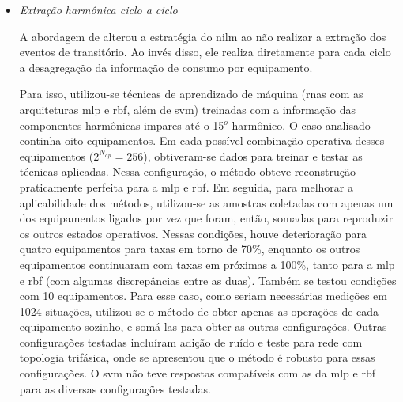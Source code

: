 \begin{enumerate}[label=\textbf{2.\arabic*},wide=\parindent]
\begin{itemize}[wide=\parindent]
\item \emph{Extração harmônica ciclo a ciclo}
\label{nilm:harmonico_ciclo_ciclo}

A abordagem de \citet{nilm_srinivasan_nn_2006_27} alterou a estratégia
do \gls{nilm} ao não realizar a extração dos eventos de transitório.
Ao invés disso, ele realiza diretamente para cada ciclo a desagregação
da informação de consumo por equipamento. 

Para isso, utilizou-se técnicas de aprendizado
de máquina (\glspl{rna} com as arquiteturas \acs{mlp} e
\acs{rbf}, além de \acs{svm}) treinadas com a informação das
componentes harmônicas impares até o 15$^o$ harmônico. O caso
analisado continha oito equipamentos. Em cada possível combinação
operativa desses equipamentos ($2^{N_{ap}}=256$), obtiveram-se dados para
treinar e testar as técnicas aplicadas. Nessa configuração, o método
obteve reconstrução praticamente perfeita para a \gls{mlp} e
\gls{rbf}. Em seguida, para melhorar a aplicabilidade dos métodos,
utilizou-se as amostras coletadas com apenas um dos equipamentos ligados
por vez que foram, então, somadas para reproduzir os outros estados
operativos. Nessas condições, houve deterioração para quatro
equipamentos para taxas em torno de 70\%, enquanto os outros equipamentos
continuaram com taxas em próximas a 100\%, tanto para a \gls{mlp} e
\gls{rbf} (com algumas discrepâncias entre as duas). Também se testou
condições com 10 equipamentos. Para esse caso, como seriam necessárias
medições em 1024 situações, utilizou-se o método de obter apenas as
operações de cada equipamento sozinho, e somá-las para obter as outras
configurações. Outras configurações testadas incluíram adição de
ruído e teste para rede com topologia trifásica, onde se apresentou
que o método é robusto para essas configurações. O \gls{svm} não teve
respostas compatíveis com as da \gls{mlp} e \gls{rbf} para as diversas
configurações testadas.


\end{itemize}
\end{enumerate}
